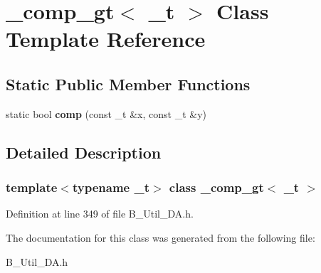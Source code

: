 \section{\_\-comp\_\-gt$<$ \_\-t $>$ Class Template Reference}
\label{class__comp__gt}
\subsection*{Static Public Member Functions}
\begin{DoxyCompactItemize}
\item 
static bool {\bfseries comp} (const \_\-t \&x, const \_\-t \&y)\label{class__comp__gt_a82581319ab397721d0ce28a9dc620d5d}

\end{DoxyCompactItemize}


\subsection{Detailed Description}
\subsubsection*{template$<$typename \_\-t$>$ class \_\-comp\_\-gt$<$ \_\-t $>$}



Definition at line 349 of file B\_\-Util\_\-DA.h.

The documentation for this class was generated from the following file:\begin{DoxyCompactItemize}
\item 
B\_\-Util\_\-DA.h\end{DoxyCompactItemize}
